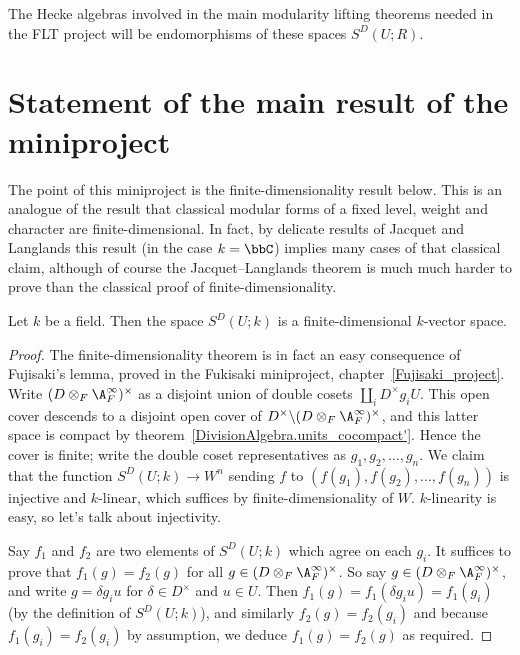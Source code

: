 The Hecke algebras involved in the main modularity lifting
theorems needed in the FLT project will be endomorphisms of these spaces $S^D(U;R)$.

\section{Statement of the main result of the miniproject}

The point of this miniproject is the finite-dimensionality result below.
This is an analogue of the result that classical modular forms of a fixed
level, weight and character are finite-dimensional. In fact, by delicate results
of Jacquet and Langlands this result (in the case $k=\bbC$) implies many cases of that classical claim,
although of course the Jacquet--Langlands theorem is much much harder to prove than the classical
proof of finite-dimensionality.


\begin{theorem}
  \label{TotallyDefiniteQuaternionAlgebra.AutomorphicForm.finiteDimensional}
  Let $k$ be a field. Then the space $S^D(U;k)$ is a finite-dimensional $k$-vector space.
\end{theorem}



\begin{proof}
  The finite-dimensionality theorem is in fact an easy consequence of Fujisaki's lemma,
  proved in the Fukisaki miniproject, chapter~\ref{Fujisaki_project}.
  Write $(D\otimes_F\A_F^\infty)^\times$ as a disjoint union of double cosets
  $\coprod_i D^\times g_i U$. This open cover descends to a disjoint open
  cover of $D^\times\backslash (D\otimes_F\A_F^\infty)^\times$,
  and this latter space is compact by theorem~\ref{DivisionAlgebra.units_cocompact'}.
  Hence the cover is finite; write the double coset representatives
  as $g_1,g_2,\ldots,g_n$. We claim that
  the function $S^D(U;k)\to W^n$ sending $f$ to $(f(g_1),f(g_2),\ldots,f(g_n))$
  is injective and $k$-linear, which suffices by finite-dimensionality of $W$.
  $k$-linearity is easy, so let's talk about injectivity.

  Say $f_1$ and $f_2$ are two elements of $S^D(U;k)$ which agree on
  each $g_i$. It suffices to prove that $f_1(g)=f_2(g)$ for all
  $g\in(D\otimes_F\A_F^\infty)^\times$. So say $g\in(D\otimes_F\A_F^\infty)^\times$,
  and write $g=\delta g_iu$ for $\delta \in D^\times$ and $u\in U$.
  Then $f_1(g)=f_1(\delta g_iu)=f_1(g_i)$ (by the definition of $S^D(U;k)$), and similarly $f_2(g)=f_2(g_i)$
  and because $f_1(g_i)=f_2(g_i)$ by assumption, we deduce $f_1(g)=f_2(g)$ as required.
\end{proof}
